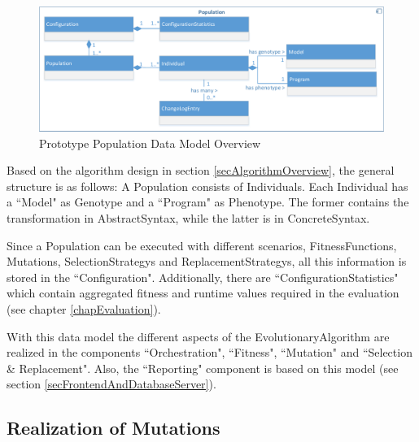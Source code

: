 \begin{figure}[htb]
	\centering
	\includegraphics[scale=0.6]{Images/PrototypeArchitectureV1PopulationDataModel.pdf} 
	\caption{Prototype Population Data Model Overview}
	\label{figPrototypeArchitectureV1PopulationDataModel}
\end{figure}


Based on the algorithm design in section \ref{secAlgorithmOverview}, the general structure is as follows: A \gls{Population} consists of \glspl{Individual}. Each \gls{Individual} has a ``Model" as \gls{Genotype} and a ``Program" as \gls{Phenotype}. The former contains the transformation in \gls{AbstractSyntax}, while the latter is in \gls{ConcreteSyntax}.

Since a \gls{Population} can be executed with different scenarios, \glspl{FitnessFunction}, \glspl{Mutation}, \glspl{SelectionStrategy} and \glspl{ReplacementStrategy}, all this information is stored in the ``Configuration". Additionally, there are ``ConfigurationStatistics" which contain aggregated fitness and runtime values required in the evaluation (see chapter \ref{chapEvaluation}).

With this data model the different aspects of the \gls{EvolutionaryAlgorithm} are realized in the components ``Orchestration", ``Fitness", ``Mutation" and ``Selection \& Replacement". Also, the ``Reporting" component is based on this model (see section \ref{secFrontendAndDatabaseServer}).

\subsection{Realization of Mutations}
\label{secRealizationOfMutations}


